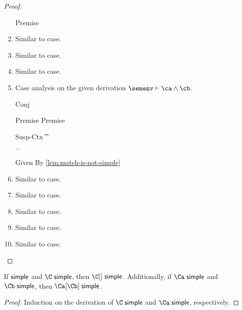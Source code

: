 \documentclass[acmsmall,screen,nonacm,review]{acmart}
\begin{document}
\begin{lemma}
\begin{proof}
\begin{enumerate}[(\roman*)]
\begin{proofcases}
	    \begin{llproof}
\Hand 		\eqPf{\semenv(\ta)}{\semenv(\tb)}  {Premise}
	    \end{llproof}
	\end{proofcases}

      \item Similar to  case.
      \item Similar to  case.
      \item Similar to  case.

      \item Case analysis on the given derivation $\semenv \th \ca \cand \cb$.
      \begin{proofcases}
	\proofcasederivation
	  {Conj}
	  {\semenv \th \ca \\ \semenv \th \cb}
	  {\semenv \th \ca \cand \cb}

	\begin{llproof}
\Hand 	  \vdashPf{\semenv}{\ca} {Premise}
\Hand     \vdashPf{\semenv}{\cb} {Premise}
	\end{llproof}

	\proofcasederivation
	  {Susp-Ctx}
	  {\Cshape \C \t \sh \\ \semenv \th \C\where{\cmatched \t \sh \cbrs}}
	  {\semenv \th \underbrace{\C\where{\cmatch \t \cbrs}}_{\ca \cand \cb}}

	\begin{llproof}
	  \simplePf{\C\where{\cmatch \t \cbrs}} {Given}
	  \nsimplePf{\C\where{\cmatch \t \cbrs}} {By \cref{lem:match-is-not-simple}}
\Hand 	  \contraPf{\semenv \th \ca, \semenv \th \cb}
	\end{llproof}

      \end{proofcases}

      \item Similar to  case.
      \item Similar to  case.
      \item Similar to  case.
      \item Similar to  case.
      \item Similar to  case.
    \end{enumerate}
  \end{proof}
\end{lemma}

\begin{lemma}
  \label{lem:compose-simple}
  If $\relax \mathrel{\mathsf{simple}}\mathclose{}$ and $\C \simple$, then $\C\where\c \simple$.
  Additionally, if $\Ca \simple$ and $\Cb \simple$, then $\Ca\where\Cb \simple$.
  \begin{proof}
    Induction on the derivation of $\C \simple$ and $\Ca \simple$, respectively.
  \end{proof}
\end{lemma}
\end{document}
